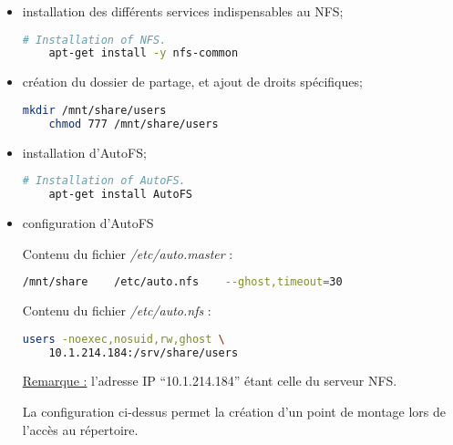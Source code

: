 \begin{itemize}
\item installation des différents services indispensables au NFS;

  \begin{lstlisting}[language=bash]
    # Installation of NFS.
    apt-get install -y nfs-common
  \end{lstlisting}

    \item création du dossier de partage, et ajout de droits
      spécifiques;

  \begin{lstlisting}[language=bash]
    mkdir /mnt/share/users
    chmod 777 /mnt/share/users
  \end{lstlisting}

\item installation d'AutoFS;

  \begin{lstlisting}[language=bash]
    # Installation of AutoFS.
    apt-get install AutoFS
  \end{lstlisting}

\item configuration d'AutoFS

  Contenu du fichier \textit{/etc/auto.master} :

  \begin{lstlisting}[language=bash]
    /mnt/share    /etc/auto.nfs    --ghost,timeout=30
  \end{lstlisting}

  Contenu du fichier \textit{/etc/auto.nfs} :

  \begin{lstlisting}[language=bash]
    users -noexec,nosuid,rw,ghost \
    10.1.214.184:/srv/share/users
  \end{lstlisting}

  \underline{Remarque :} l'adresse IP ``10.1.214.184'' étant celle du serveur NFS.

  La configuration ci-dessus permet la création d'un point de montage lors de
  l'accès au répertoire.
\end{itemize}

